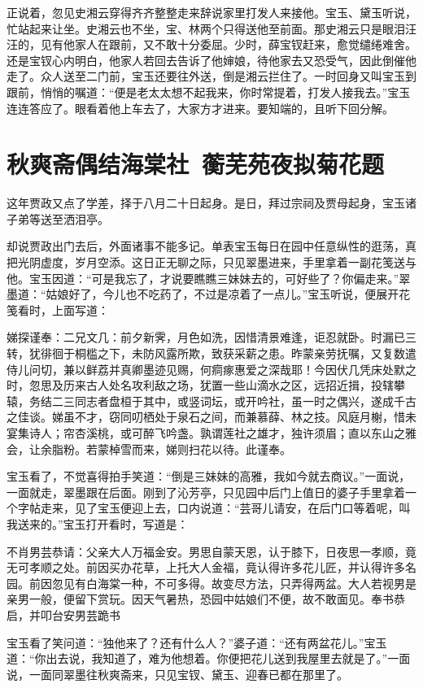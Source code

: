 \documentclass[12pt,oneside]{book}
\begin{document}
正说着，忽见史湘云穿得齐齐整整走来辞说家里打发人来接他。宝玉、黛玉听说，忙站起来让坐。史湘云也不坐，宝、林两个只得送他至前面。那史湘云只是眼泪汪汪的，见有他家人在跟前，又不敢十分委屈。少时，薛宝钗赶来，愈觉缱绻难舍。还是宝钗心内明白，他家人若回去告诉了他婶娘，待他家去又恐受气，因此倒催他走了。众人送至二门前，宝玉还要往外送，倒是湘云拦住了。一时回身又叫宝玉到跟前，悄悄的嘱道：“便是老太太想不起我来，你时常提着，打发人接我去。”宝玉连连答应了。眼看着他上车去了，大家方才进来。要知端的，且听下回分解。


 
\chapter{秋爽斋偶结海棠社~蘅芜苑夜拟菊花题}
这年贾政又点了学差，择于八月二十日起身。是日，拜过宗祠及贾母起身，宝玉诸子弟等送至洒泪亭。

却说贾政出门去后，外面诸事不能多记。单表宝玉每日在园中任意纵性的逛荡，真把光阴虚度，岁月空添。这日正无聊之际，只见翠墨进来，手里拿着一副花笺送与他。宝玉因道：“可是我忘了，才说要瞧瞧三妹妹去的，可好些了？你偏走来。”翠墨道：“姑娘好了，今儿也不吃药了，不过是凉着了一点儿。”宝玉听说，便展开花笺看时，上面写道：

娣探谨奉：二兄文几：前夕新霁，月色如洗，因惜清景难逢，讵忍就卧。时漏已三转，犹徘徊于桐槛之下，未防风露所欺，致获采薪之患。昨蒙亲劳抚嘱，又复数遣侍儿问切，兼以鲜荔并真卿墨迹见赐，何痌瘃惠爱之深哉耶！今因伏几凭床处默之时，忽思及历来古人处名攻利敌之场，犹置一些山滴水之区，远招近揖，投辖攀辕，务结二三同志者盘桓于其中，或竖词坛，或开吟社，虽一时之偶兴，遂成千古之佳谈。娣虽不才，窃同叨栖处于泉石之间，而兼慕薛、林之技。风庭月榭，惜未宴集诗人；帘杏溪桃，或可醉飞吟盏。孰谓莲社之雄才，独许须眉；直以东山之雅会，让余脂粉。若蒙棹雪而来，娣则扫花以待。此谨奉。

宝玉看了，不觉喜得拍手笑道：“倒是三妹妹的高雅，我如今就去商议。”一面说，一面就走，翠墨跟在后面。刚到了沁芳亭，只见园中后门上值日的婆子手里拿着一个字帖走来，见了宝玉便迎上去，口内说道：“芸哥儿请安，在后门口等着呢，叫我送来的。”宝玉打开看时，写道是：

不肖男芸恭请：父亲大人万福金安。男思自蒙天恩，认于膝下，日夜思一孝顺，竟无可孝顺之处。前因买办花草，上托大人金福，竟认得许多花儿匠，并认得许多名园。前因忽见有白海棠一种，不可多得。故变尽方法，只弄得两盆。大人若视男是亲男一般，便留下赏玩。因天气暑热，恐园中姑娘们不便，故不敢面见。奉书恭启，并叩台安男芸跪书

宝玉看了笑问道：“独他来了？还有什么人？”婆子道：“还有两盆花儿。”宝玉道：“你出去说，我知道了，难为他想着。你便把花儿送到我屋里去就是了。”一面说，一面同翠墨往秋爽斋来，只见宝钗、黛玉、迎春已都在那里了。
\end{document}

